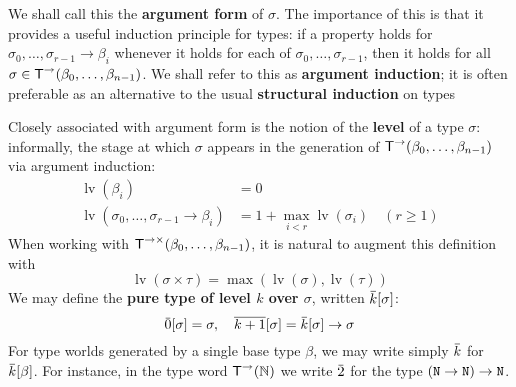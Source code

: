 \documentclass[11pt]{article}
\DeclareMathOperator{\lv}{lv}
\begin{document}
We shall call this the \textbf{argument form} of \(\sigma\). The importance of this is that it provides a useful
induction principle for types: if a property holds for \(\sigma_0,\dots,\sigma_{r-1}\to\beta_i\) whenever it holds
for each of \(\sigma_0,\dots,\sigma_{r-1}\), then it holds for all \(\sigma\in\textsf{T}^{\to}(\beta_0,\dots,\beta_{n-1})\). We shall
refer to this as \textbf{argument induction}; it is often preferable as an alternative to the usual
\textbf{structural induction} on types

Closely associated with argument form is the notion of the \textbf{level} of a type \(\sigma\): informally, the
stage at which \(\sigma\) appears in the generation of \(\textsf{T}^\to(\beta_0,\dots,\beta_{n-1})\) via argument induction:
\begin{align*}
\lv(\beta_i)&=0\\
\lv(\sigma_0,\dots,\sigma_{r-1}\to\beta_i)&=1+\max_{i<r}\lv(\sigma_i)\quad(r\ge 1)
\end{align*}
When working with \(\textsf{T}^{\to\times}(\beta_0,\dots,\beta_{n-1})\), it is natural to augment this definition with
\begin{equation*}
\lv(\sigma\times\tau)=\max(\lv(\sigma),\lv(\tau))
\end{equation*}
We may define the \textbf{pure type of level \(k\) over \(\sigma\)}, written \(\bark[\sigma]\):
\begin{equation*}
\bbar{0}[\sigma]=\sigma,\quad\ove{k+1}[\sigma]=\bark[\sigma]\to\sigma
\end{equation*}
For type worlds generated by a single base type \(\beta\), we may write simply \(\bark\)
for \(\bark[\beta]\). For instance, in the type word \(\textsf{T}^{\to}(\mathbb{N})\) we write \(\bbar{2}\) for the
type \((\texttt{N}\to\texttt{N})\to\texttt{N}\).
\end{document}
